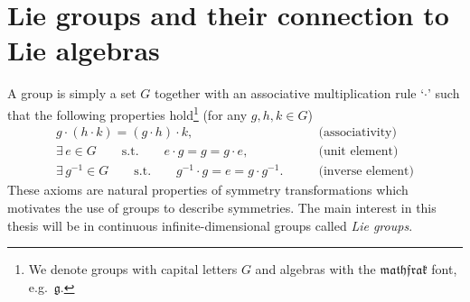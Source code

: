 \section{Lie groups and their connection to Lie algebras}\label{sec:groups}
A group is simply a set $G$ together with an associative multiplication rule `$\cdot$' such that the following properties hold\footnote{We denote groups with capital letters $G$ and algebras with the $\mathfrak{mathfrak}$ font, e.g.\ $\mathfrak{g}$.} (for any $g,h,k\in G$)
\begin{align*}
    g\cdot \left(h\cdot k\right) = \left(g\cdot h\right)\cdot k, \qquad &\text{(associativity)}\\
    \exists\, e \in G \qquad \text{s.t.} \qquad e\cdot g = g = g \cdot e,\qquad &\text{(unit element)}\\
    \exists\, g^{-1}\in G\qquad \text{s.t.}\qquad g^{-1}\cdot g = e = g\cdot g^{-1}. \qquad &\text{(inverse element)}
\end{align*}
These axioms are natural properties of symmetry transformations which motivates the use of groups to describe symmetries. The main interest in this thesis will be in continuous infinite-dimensional groups called \emph{Lie groups}. 


